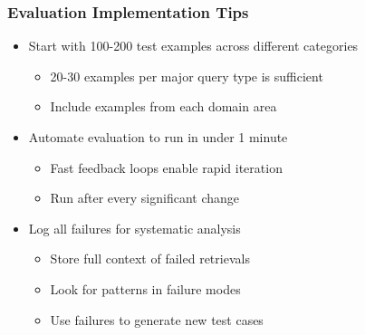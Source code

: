 {    \begin{frame}
        \frametitle{Evaluation Implementation Tips}
        \begin{itemize}
            \item Start with 100-200 test examples across different categories
            \begin{itemize}
                \item 20-30 examples per major query type is sufficient
                \item Include examples from each domain area
            \end{itemize}
            \item Automate evaluation to run in under 1 minute
            \begin{itemize}
                \item Fast feedback loops enable rapid iteration
                \item Run after every significant change
            \end{itemize}
            \item Log all failures for systematic analysis
            \begin{itemize}
                \item Store full context of failed retrievals
                \item Look for patterns in failure modes
                \item Use failures to generate new test cases
            \end{itemize}
        \end{itemize}
    \end{frame}

}
